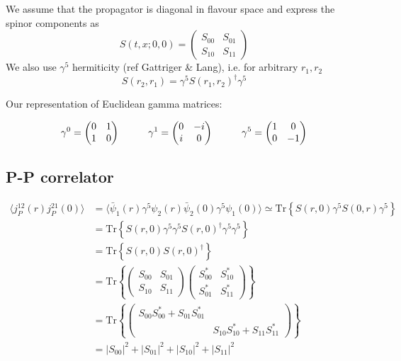 \documentclass{article}
\newcommand{\Tr}[1]{\text{Tr}\left\{ #1 \right\}}
\begin{document}
We assume that the propagator is diagonal in flavour space and express the spinor components as 
\begin{equation}
    S(t, x; 0, 0) = \begin{pmatrix} S_{00} & S_{01} \\ S_{10} & S_{11} \end{pmatrix}    
\end{equation}
We also use $\gamma^5$ hermiticity (ref Gattriger \& Lang), i.e. for arbitrary $r_1, r_2$ 
\begin{equation}
    S(r_2, r_1) = \gamma^5 S(r_1, r_2)^\dagger \gamma^5
\end{equation}

Our representation of Euclidean gamma matrices:

\begin{equation}
    \gamma^0 = \begin{pmatrix} 0 & 1 \\ 1 & 0 \end{pmatrix} \hspace{10mm}
    \gamma^1 = \begin{pmatrix} 0 & -i \\ i & 0 \end{pmatrix} \hspace{10mm}
    \gamma^5 = \begin{pmatrix} 1 & 0 \\ 0 & -1 \end{pmatrix}
\end{equation}

\subsection{P-P correlator}

\begin{align*}
    \langle j_P^{12} (r) j_P^{21}(0) \rangle &= \langle \bar\psi_1(r) \gamma^5 \psi_2(r) \bar\psi_2(0) \gamma^5 \psi_1(0) \rangle \simeq \Tr{S(r, 0) \gamma^5 S(0, r) \gamma^5} \\
    &= \Tr{S(r, 0) \gamma^5 \gamma^5 S(r, 0)^\dagger \gamma^5 \gamma^5} \\
    &= \Tr{S(r, 0) S(r, 0)^\dagger} \\
    &= \Tr{ \begin{pmatrix} S_{00} & S_{01} \\ S_{10} & S_{11} \end{pmatrix} \begin{pmatrix} S_{00}^* & S_{10}^* \\ S_{01}^* & S_{11}^* \end{pmatrix} } \\
    &= \Tr{\begin{pmatrix} S_{00} S_{00}^* + S_{01} S_{01}^* &  \\ & S_{10} S_{10}^* + S_{11} S_{11}^* \end{pmatrix}} \\
    &= |S_{00}|^2 + |S_{01}|^2 + |S_{10}|^2 + |S_{11}|^2
\end{align*}
\end{document}
